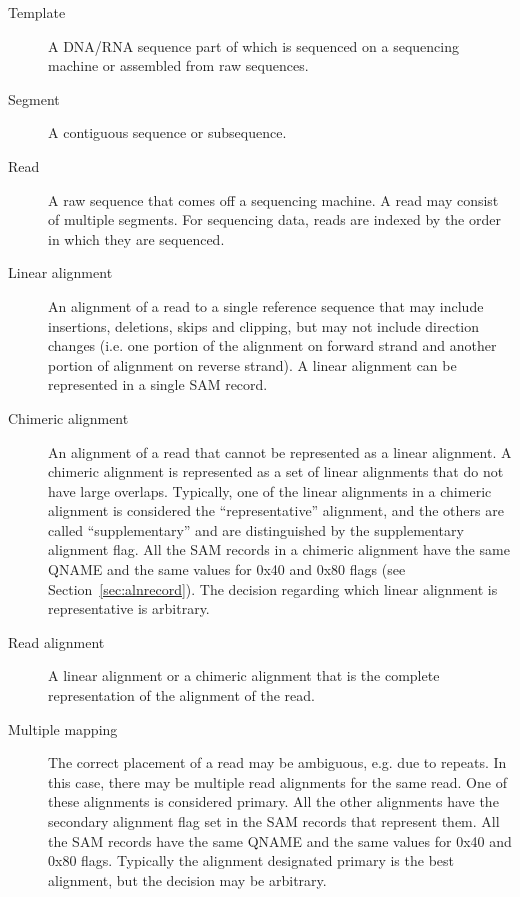 \documentclass[10pt]{article}
\begin{document}
\begin{description}
\item[Template] A DNA/RNA sequence part of which is sequenced on a
  sequencing machine or assembled from raw sequences.

\item[Segment] A contiguous sequence or subsequence.

\item[Read] A raw sequence that comes off a sequencing machine. A read
  may consist of multiple segments. For sequencing data, reads are indexed by
  the order in which they are sequenced.

\item[Linear alignment]
  An alignment of a read to a single reference sequence that may include
  insertions, deletions, skips and clipping, but may not include direction
  changes (i.e. one portion of the alignment on forward strand and another
  portion of alignment on reverse strand). A linear alignment can be
  represented in a single SAM record.

\item[Chimeric alignment]
  An alignment of a read that cannot be represented as a linear alignment. A
  chimeric alignment is represented as a set of linear alignments that do not
  have large overlaps.  Typically, one of the linear alignments in a chimeric
  alignment is considered the ``representative'' alignment, and the others are
  called ``supplementary'' and are distinguished by the supplementary alignment
  flag.  All the SAM records in a chimeric alignment have the same {\sf QNAME}
  and the same values for 0x40 and 0x80 flags (see Section~\ref{sec:alnrecord}).
  The decision regarding which linear alignment is representative is arbitrary.

\item[Read alignment]
  A linear alignment or a chimeric alignment that is the complete
  representation of the alignment of the read.

\item[Multiple mapping]
  The correct placement of a read may be ambiguous, e.g. due to repeats.  In
  this case, there may be multiple read alignments for the same read.  One of
  these alignments is considered primary.  All the other alignments have the
  secondary alignment flag set in the SAM records that represent them.  All the
  SAM records have the same {\sf QNAME} and the same values for 0x40 and 0x80
  flags.  Typically the alignment designated primary is the best alignment, but
  the decision may be arbitrary.\footnotemark


\end{description}
\end{document}
